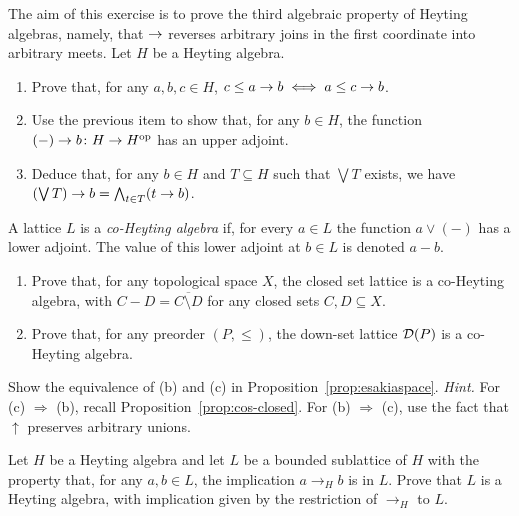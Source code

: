 \begin{exercise}\label{exe:htofirstcoordinate}
 The aim of this exercise is to prove the third algebraic property of Heyting algebras, namely, that $\to$ reverses arbitrary joins in the first coordinate into arbitrary meets. Let $H$ be a Heyting algebra.
\begin{enumerate}
\item Prove that, for any $a, b, c \in H$, $c \leq a \to b \iff a \leq c \to b$.
\item Use the previous item to show that, for any $b \in H$, the function $(-) \to b \colon H \to H^{\mathrm{op}}$ has an upper adjoint. 
\item Deduce that, for any $b \in H$ and $T \subseteq H$ such that $\bigvee T$ exists, we have $\left(\bigvee T\right) \to b = \bigwedge_{t \in T} (t \to b)$.
\end{enumerate}
\end{exercise}

\begin{exercise}\label{exe:coheyting}
A lattice $L$ is a \emph{co-Heyting algebra} if, for every $a \in L$ the function $a \vee (-)$ has a lower adjoint. The value of this lower adjoint at $b \in L$ is denoted $a - b$.
\begin{enumerate}
\item Prove that, for any topological space $X$, the closed set lattice is a co-Heyting algebra, with $C - D = \overline{C \setminus D}$ for any closed sets $C, D \subseteq X$.
\item Prove that, for any preorder $(P, \leq)$, the down-set lattice $\mathcal{D}(P)$ is a co-Heyting algebra.
\end{enumerate}
\end{exercise}

\begin{exercise}\label{exe:Esakia-equiv} Show the equivalence of (b) and (c) in
Proposition~\ref{prop:esakiaspace}. {\it Hint.} For (c) $\Rightarrow$ (b),
recall Proposition~\ref{prop:cos-closed}. For (b) $\Rightarrow$ (c), use the
fact that ${\uparrow}$ preserves arbitrary unions.  \end{exercise}

\begin{exercise}\label{exe:heytingsub}
Let $H$ be a Heyting algebra and let $L$ be a bounded sublattice of $H$ with the property that, for any $a, b \in L$, the implication $a \to_H b$ is in $L$. Prove that $L$ is a Heyting algebra, with implication given by the restriction of $\to_H$ to $L$.
\end{exercise}

